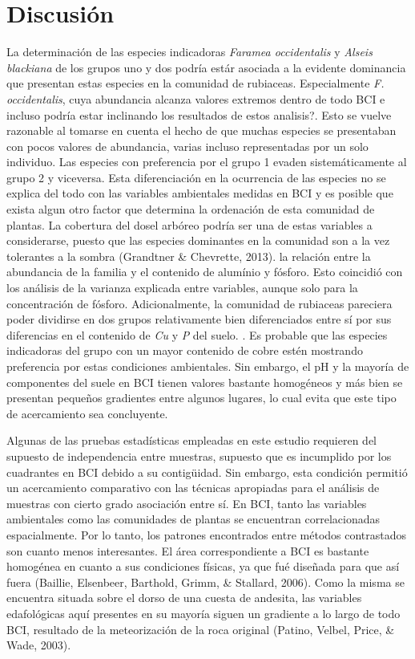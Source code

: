 \documentclass[11pt,]{article}
\begin{document}
\section{Discusión}\label{discusiuxf3n}

La determinación de las especies indicadoras \emph{Faramea occidentalis}
y \emph{Alseis blackiana} de los grupos uno y dos podría estár asociada
a la evidente dominancia que presentan estas especies en la comunidad de
rubiaceas. Especialmente \emph{F. occidentalis}, cuya abundancia alcanza
valores extremos dentro de todo BCI e incluso podría estar inclinando
los resultados de estos analisis?. Esto se vuelve razonable al tomarse
en cuenta el hecho de que muchas especies se presentaban con pocos
valores de abundancia, varias incluso representadas por un solo
individuo. Las especies con preferencia por el grupo 1 evaden
sistemáticamente al grupo 2 y viceversa. Esta diferenciación en la
ocurrencia de las especies no se explica del todo con las variables
ambientales medidas en BCI y es posible que exista algun otro factor que
determina la ordenación de esta comunidad de plantas. La cobertura del
dosel arbóreo podría ser una de estas variables a considerarse, puesto
que las especies dominantes en la comunidad son a la vez tolerantes a la
sombra (Grandtner \& Chevrette, 2013). la relación entre la abundancia
de la familia y el contenido de alumínio y fósforo. Esto coincidió con
los análisis de la varianza explicada entre variables, aunque solo para
la concentración de fósforo. Adicionalmente, la comunidad de rubiaceas
pareciera poder dividirse en dos grupos relativamente bien diferenciados
entre sí por sus diferencias en el contenido de \emph{Cu} y \emph{P} del
suelo. . Es probable que las especies indicadoras del grupo con un mayor
contenido de cobre estén mostrando preferencia por estas condiciones
ambientales. Sin embargo, el pH y la mayoría de componentes del suele en
BCI tienen valores bastante homogéneos y más bien se presentan pequeños
gradientes entre algunos lugares, lo cual evita que este tipo de
acercamiento sea concluyente.

Algunas de las pruebas estadísticas empleadas en este estudio requieren
del supuesto de independencia entre muestras, supuesto que es incumplido
por los cuadrantes en BCI debido a su contigüidad. Sin embargo, esta
condición permitió un acercamiento comparativo con las técnicas
apropiadas para el análisis de muestras con cierto grado asociación
entre sí. En BCI, tanto las variables ambientales como las comunidades
de plantas se encuentran correlacionadas espacialmente. Por lo tanto,
los patrones encontrados entre métodos contrastados son cuanto menos
interesantes. El área correspondiente a BCI es bastante homogénea en
cuanto a sus condiciones físicas, ya que fué diseñada para que así fuera
(Baillie, Elsenbeer, Barthold, Grimm, \& Stallard, 2006). Como la misma
se encuentra situada sobre el dorso de una cuesta de andesita, las
variables edafológicas aquí presentes en su mayoría siguen un gradiente
a lo largo de todo BCI, resultado de la meteorización de la roca
original (Patino, Velbel, Price, \& Wade, 2003).
\end{document}
